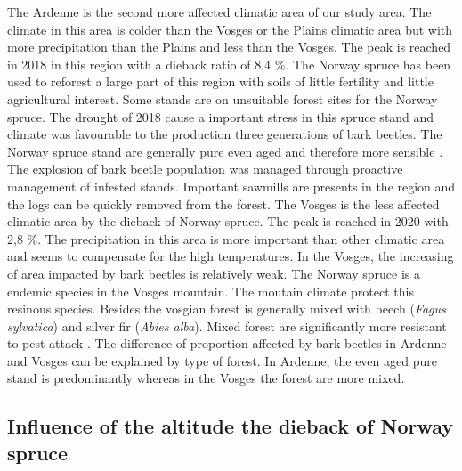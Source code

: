 \documentclass[3p,procedia]{elsarticle}
\begin{document}
The Ardenne is the second more affected climatic area of our study area. 
The climate in this area is colder than the Vosges or the Plains climatic area but with more precipitation than the Plains and less than the Vosges.
The peak is reached in 2018 in this region with a dieback ratio of 8,4 \%. 
The Norway spruce has been used to reforest a large part of this region with soils of little fertility and little agricultural interest. 
Some stands are on unsuitable forest sites for the Norway spruce. 
The drought of 2018 cause a important stress in this spruce stand and climate was favourable to the production three generations of bark beetles.
The Norway spruce stand are generally pure even aged and therefore more sensible \citep{jactel_2021}.
The explosion of bark beetle population was managed through proactive management of infested stands.
Important sawmills are presents in the region and the logs can be quickly removed from the forest.
The Vosges is the less affected climatic area by the dieback of Norway spruce.
The peak is reached in 2020 with 2,8 \%.
The precipitation in this area is more important than other climatic area and seems to compensate for the high temperatures.
In the Vosges, the increasing of area impacted by bark beetles is relatively weak.
The Norway spruce is a endemic species in the Vosges mountain. 
The moutain climate protect this resinous species. 
Besides the vosgian forest is generally mixed with beech (\textit{Fagus sylvatica}) and  silver fir (\textit{Abies alba}).
Mixed forest are significantly more resistant to pest attack \citep{jactel_2021}. 
The difference of proportion affected by bark beetles in Ardenne and Vosges can be explained by type of forest.
In Ardenne, the even aged pure stand is predominantly whereas in the Vosges  the forest are more mixed. 
\fi
\subsection{Influence of the altitude the dieback of Norway spruce}
\end{document}
